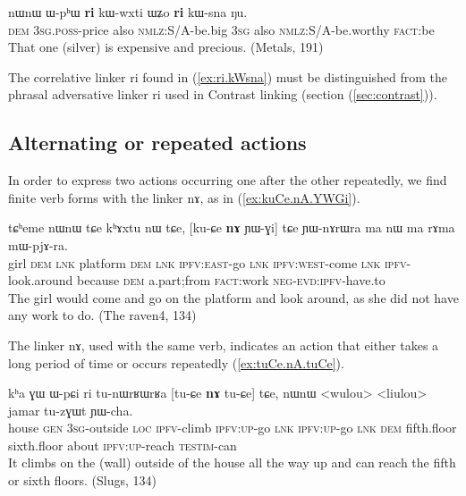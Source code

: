 \documentclass[oldfontcommands,oneside,a4paper,11pt]{article}
\newcommand{\ipa}[1]{{\phon \mbox{#1}}} %
\newcommand{\refb}[1]{(\ref{#1})}
\begin{document}
 \begin{exe}
\ex \label{ex:ri.kWsna}
\gll
\ipa{nɯnɯ}  	\ipa{ɯ-pʰɯ}  	\ipa{\textbf{ri}}  	\ipa{kɯ-wxti}  	\ipa{ɯʑo}  	\ipa{\textbf{ri}}  	\ipa{kɯ-sna}  	\ipa{ŋu.}  \\
\textsc{dem} \textsc{3sg.poss}-price also \textsc{nmlz:S/A}-be.big \textsc{3sg} also \textsc{nmlz:S/A}-be.worthy \textsc{fact}:be \\
\glt That one (silver) is expensive and precious. (Metals, 191)
\end{exe}

The correlative linker \ipa{ri} found in \refb{ex:ri.kWsna} must be distinguished from the phrasal adversative linker \ipa{ri} used in Contrast linking (section \refb{sec:contrast}).

\subsection{Alternating or repeated actions} \label{sec:alternating}

In order to express two actions occurring one after the other repeatedly, we find finite verb forms with the linker \ipa{nɤ}, as in \refb{ex:kuCe.nA.YWGi}.

\begin{exe}
\ex \label{ex:kuCe.nA.YWGi}
\gll
\ipa{tɕʰeme}  	\ipa{nɯnɯ}  	\ipa{tɕe}  	\ipa{kʰɤxtu}  	\ipa{nɯ}  	\ipa{tɕe,}  	[\ipa{ku-ɕe}  	\ipa{\textbf{nɤ}}  	\ipa{ɲɯ-ɣi}]  	\ipa{tɕe}  	\ipa{ɲɯ-nɤrɯra}  	\ipa{ma}  	\ipa{nɯ}  	\ipa{ma}  	\ipa{rɤma}  	\ipa{mɯ-pjɤ-ra.}  \\
girl \textsc{dem} \textsc{lnk} platform \textsc{dem} \textsc{lnk} \textsc{ipfv:east}-go \textsc{lnk} \textsc{ipfv:west}-come \textsc{lnk} \textsc{ipfv}-look.around because \textsc{dem} a.part;from \textsc{fact}:work \textsc{neg-evd:ipfv}-have.to \\ 
\glt The girl would come and go on the platform and look around, as she did not have any work to do. (The raven4, 134)
\end{exe}


The linker \ipa{nɤ}, used with the same verb, indicates an action that either takes a long period of time or occurs repeatedly \refb{ex:tuCe.nA.tuCe}.
\begin{exe}
\ex \label{ex:tuCe.nA.tuCe}
\gll
\ipa{kʰa}  	\ipa{ɣɯ}  	\ipa{ɯ-pɕi}  	\ipa{ri}  	\ipa{tu-nɯrʁɯrʁa}  	[\ipa{tu-ɕe}  	\ipa{\textbf{nɤ}}  	\ipa{tu-ɕe}]  	\ipa{tɕe,}  	\ipa{nɯnɯ}  	<wulou>  	<liulou>  	\ipa{jamar}  	\ipa{tu-zɣɯt}  	\ipa{ɲɯ-cha.}  \\
house \textsc{gen} \textsc{3sg}-outside \textsc{loc} \textsc{ipfv}-climb \textsc{ipfv:up}-go \textsc{lnk} \textsc{ipfv:up}-go \textsc{lnk} \textsc{dem} fifth.floor sixth.floor about \textsc{ipfv:up}-reach \textsc{testim}-can \\
\glt It climbs on the (wall) outside of the house all the way up and can reach the fifth or   sixth floors.
(Slugs, 134)
\end{exe}
 
\end{document}
